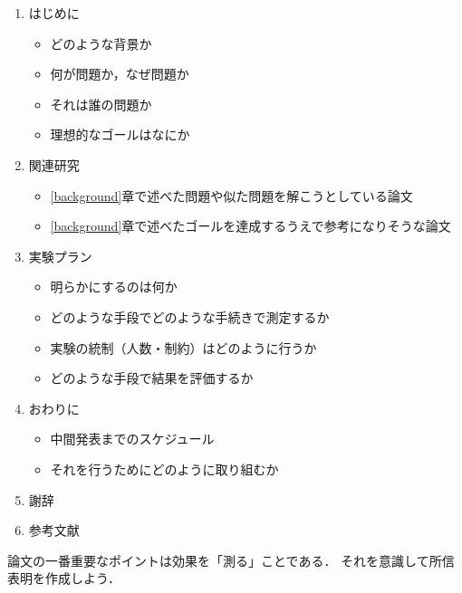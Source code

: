 \documentclass[a4j]{matsushita-zemi}
\begin{document}
\begin{small}
  \begin{framed}
    \begin{enumerate}

    \item はじめに
      \begin{itemize}
      \item どのような背景か
      \item 何が問題か，なぜ問題か
      \item それは誰の問題か
      \item 理想的なゴールはなにか
      \end{itemize}

    \item 関連研究
      \begin{itemize}
      \item \ref{background}章で述べた問題や似た問題を解こうとしている論文
      \item \ref{background}章で述べたゴールを達成するうえで参考になりそうな論文
      \end{itemize}
      
    \item 実験プラン
      \begin{itemize}
      \item 明らかにするのは何か
      \item どのような手段でどのような手続きで測定するか
      \item 実験の統制（人数・制約）はどのように行うか
      \item どのような手段で結果を評価するか
      \end{itemize}
      
    \item おわりに
      \begin{itemize}
      \item 中間発表までのスケジュール
      \item それを行うためにどのように取り組むか
      \end{itemize}
      
    \item 謝辞

    \item 参考文献
    \end{enumerate}
  \end{framed}
\end{small}

論文の一番重要なポイントは効果を「測る」ことである．
それを意識して所信表明を作成しよう．
\end{document}
